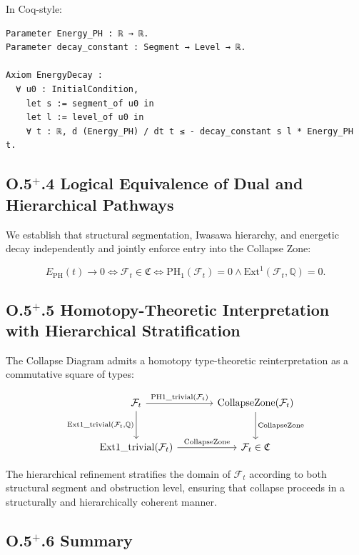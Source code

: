 \documentclass[11pt]{article}
\begin{document}
In Coq-style:

\begin{lstlisting}[language=Coq]
Parameter Energy_PH : ℝ → ℝ.
Parameter decay_constant : Segment → Level → ℝ.

Axiom EnergyDecay :
  ∀ u0 : InitialCondition,
    let s := segment_of u0 in
    let l := level_of u0 in
    ∀ t : ℝ, d (Energy_PH) / dt t ≤ - decay_constant s l * Energy_PH t.
\end{lstlisting}

\subsection*{O.5$^+$.4 Logical Equivalence of Dual and Hierarchical Pathways}

We establish that structural segmentation, Iwasawa hierarchy, and energetic decay independently and jointly enforce entry into the Collapse Zone:

\[
E_{\mathrm{PH}}(t) \to 0 \iff \mathcal{F}_t \in \mathfrak{C} \iff \mathrm{PH}_1(\mathcal{F}_t) = 0 \land \mathrm{Ext}^1(\mathcal{F}_t, \mathbb{Q}) = 0.
\]

\subsection*{O.5$^+$.5 Homotopy-Theoretic Interpretation with Hierarchical Stratification}

The Collapse Diagram admits a homotopy type-theoretic reinterpretation as a commutative square of types:

\[
\begin{tikzcd}[row sep=large, column sep=large]
\mathcal{F}_t
  \arrow[r, "{\mathrm{PH1\_trivial}(\mathcal{F}_t)}"]
  \arrow[d, "{\mathrm{Ext1\_trivial}(\mathcal{F}_t, \mathbb{Q})}"']
& \mathrm{CollapseZone}(\mathcal{F}_t)
  \arrow[d, "{\mathrm{CollapseZone}}"] \\
\mathrm{Ext1\_trivial}(\mathcal{F}_t)
  \arrow[r, "{\mathrm{CollapseZone}}"]
& \mathcal{F}_t \in \mathfrak{C}
\end{tikzcd}
\]

The hierarchical refinement stratifies the domain of \( \mathcal{F}_t \) according to both structural segment and obstruction level, ensuring that collapse proceeds in a structurally and hierarchically coherent manner.

\subsection*{O.5$^+$.6 Summary}
\end{document}

